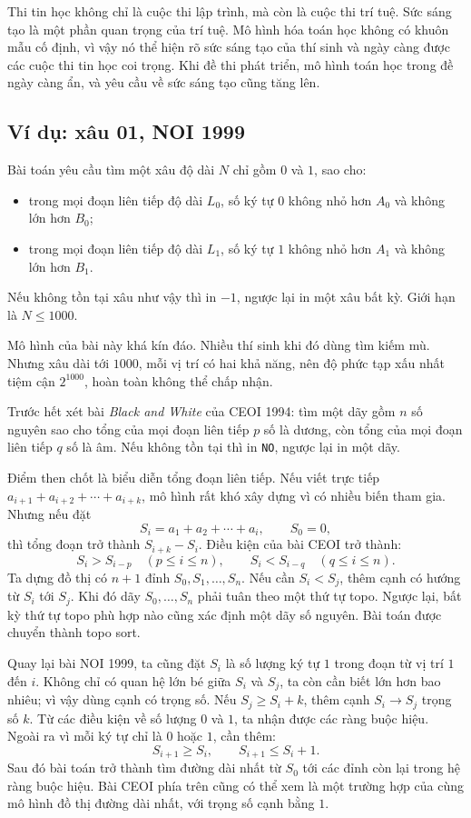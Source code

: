 \documentclass[11pt]{article}
\begin{document}
Thi tin học không chỉ là cuộc thi lập trình, mà còn là cuộc thi trí tuệ. Sức
sáng tạo là một phần quan trọng của trí tuệ. Mô hình hóa toán học không có
khuôn mẫu cố định, vì vậy nó thể hiện rõ sức sáng tạo của thí sinh và ngày
càng được các cuộc thi tin học coi trọng. Khi đề thi phát triển, mô hình toán
học trong đề ngày càng ẩn, và yêu cầu về sức sáng tạo cũng tăng lên.

\subsection{Ví dụ: xâu 01, NOI 1999}

Bài toán yêu cầu tìm một xâu độ dài \(N\) chỉ gồm \(0\) và \(1\), sao cho:
\begin{itemize}
  \item trong mọi đoạn liên tiếp độ dài \(L_0\), số ký tự \(0\) không nhỏ hơn
  \(A_0\) và không lớn hơn \(B_0\);
  \item trong mọi đoạn liên tiếp độ dài \(L_1\), số ký tự \(1\) không nhỏ hơn
  \(A_1\) và không lớn hơn \(B_1\).
\end{itemize}
Nếu không tồn tại xâu như vậy thì in \(-1\), ngược lại in một xâu bất kỳ. Giới
hạn là \(N\le 1000\).

Mô hình của bài này khá kín đáo. Nhiều thí sinh khi đó dùng tìm kiếm mù. Nhưng
xâu dài tới \(1000\), mỗi vị trí có hai khả năng, nên độ phức tạp xấu nhất
tiệm cận \(2^{1000}\), hoàn toàn không thể chấp nhận.

Trước hết xét bài \textit{Black and White} của CEOI 1994: tìm một dãy gồm
\(n\) số nguyên sao cho tổng của mọi đoạn liên tiếp \(p\) số là dương, còn
tổng của mọi đoạn liên tiếp \(q\) số là âm. Nếu không tồn tại thì in
\texttt{NO}, ngược lại in một dãy.

Điểm then chốt là biểu diễn tổng đoạn liên tiếp. Nếu viết trực tiếp
\(a_{i+1}+a_{i+2}+\cdots+a_{i+k}\), mô hình rất khó xây dựng vì có nhiều biến
tham gia. Nhưng nếu đặt
\[
  S_i=a_1+a_2+\cdots+a_i,\qquad S_0=0,
\]
thì tổng đoạn trở thành \(S_{i+k}-S_i\). Điều kiện của bài CEOI trở thành:
\[
  S_i>S_{i-p}\quad(p\le i\le n),\qquad
  S_i<S_{i-q}\quad(q\le i\le n).
\]
Ta dựng đồ thị có \(n+1\) đỉnh \(S_0,S_1,\ldots,S_n\). Nếu cần \(S_i<S_j\),
thêm cạnh có hướng từ \(S_i\) tới \(S_j\). Khi đó dãy \(S_0,\ldots,S_n\) phải
tuân theo một thứ tự topo. Ngược lại, bất kỳ thứ tự topo phù hợp nào cũng xác
định một dãy số nguyên. Bài toán được chuyển thành topo sort.

Quay lại bài NOI 1999, ta cũng đặt \(S_i\) là số lượng ký tự \(1\) trong đoạn
từ vị trí \(1\) đến \(i\). Không chỉ có quan hệ lớn bé giữa \(S_i\) và \(S_j\),
ta còn cần biết lớn hơn bao nhiêu; vì vậy dùng cạnh có trọng số. Nếu
\(S_j\ge S_i+k\), thêm cạnh \(S_i\to S_j\) trọng số \(k\). Từ các điều kiện về
số lượng \(0\) và \(1\), ta nhận được các ràng buộc hiệu. Ngoài ra vì mỗi ký
tự chỉ là \(0\) hoặc \(1\), cần thêm:
\[
  S_{i+1}\ge S_i,\qquad S_{i+1}\le S_i+1.
\]
Sau đó bài toán trở thành tìm đường dài nhất từ \(S_0\) tới các đỉnh còn lại
trong hệ ràng buộc hiệu. Bài CEOI phía trên cũng có thể xem là một trường hợp
của cùng mô hình đồ thị đường dài nhất, với trọng số cạnh bằng \(1\).
\end{document}
